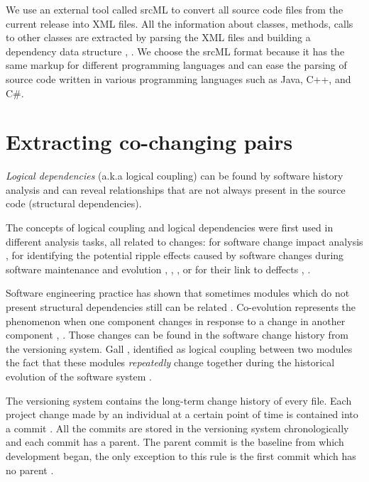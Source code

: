 \documentclass[12pt]{mitthesis}
\begin{document}
 We use an external tool called srcML \cite{srcML} to convert all source code files from the current release into XML files. All the information about classes, methods, calls to other classes are extracted by parsing the XML files and building a dependency data structure \cite{2003:XLC:851042.857028},
\cite{Collard:2011:LTF:2067850.2068011}. We choose the srcML format because it has the same markup for different programming languages and can ease the parsing of source code written in various programming languages such as Java, C++, and C\#.


\section{Extracting co-changing pairs}
\label{sec:copairs_extraction}

\textit{Logical dependencies} (a.k.a logical coupling) can be found by software history analysis and can reveal relationships that are not always present in the source code (structural dependencies).  

The concepts of logical coupling and logical dependencies were first used in different analysis tasks, all related to changes: for software change impact analysis \cite{1553643}, for identifying the potential ripple effects caused by software changes during software maintenance and evolution \cite{DBLP:conf/issre/OlivaG15}, \cite{Oliva:2011:ISL:2067853.2068086}, \cite{Poshyvanyk2009}, \cite{posh2010} or for their link to deffects \cite{wiese}, \cite{Zimmermann:2004:MVH:998675.999460}.

Software engineering practice has shown that sometimes modules which do not present structural dependencies still can be related \cite{articleEvolution}. Co-evolution represents the phenomenon when one component changes in response to a change in another component \cite{Yu:2007:UCC:1231330.1231370}, \cite{5166450}. Those changes can be found in the software change history from the versioning system. Gall \cite{Gall:1998:DLC:850947.853338}, \cite{Gall:2003:CRH:942803.943741} identified as logical coupling between two modules the fact that these modules \textit{repeatedly} change together during the historical evolution of the software system \cite{6606615}.


The versioning system contains the long-term change history of every file. Each project change made by an individual at a certain point of time is contained into a commit \cite{7471284}. All the commits are stored in the versioning system chronologically and each commit has a parent. The parent commit is the baseline from which development began, the only exception to this rule is the first commit which has no parent \cite{svn}. 
\end{document}

